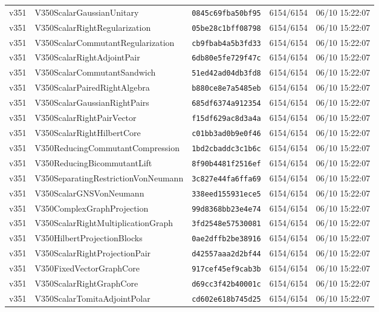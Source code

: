 \documentclass[11pt]{article}
\theoremstyle{definition}\newtheorem{deriv}{Derivação}
\begin{document}
{\begin{longtable}{@{}lllll@{}}
v351 & V350ScalarGaussianUnitary & \texttt{0845c69fba50bf95} & 6154/6154 & 06/10 15:22:07 \\
v351 & V350ScalarRightRegularization & \texttt{05be28c1bff08798} & 6154/6154 & 06/10 15:22:07 \\
v351 & V350ScalarCommutantRegularization & \texttt{cb9fbab4a5b3fd33} & 6154/6154 & 06/10 15:22:07 \\
v351 & V350ScalarRightAdjointPair & \texttt{6db80e5fe729f47c} & 6154/6154 & 06/10 15:22:07 \\
v351 & V350ScalarCommutantSandwich & \texttt{51ed42ad04db3fd8} & 6154/6154 & 06/10 15:22:07 \\
v351 & V350ScalarPairedRightAlgebra & \texttt{b880ce8e7a5485eb} & 6154/6154 & 06/10 15:22:07 \\
v351 & V350ScalarGaussianRightPairs & \texttt{685df6374a912354} & 6154/6154 & 06/10 15:22:07 \\
v351 & V350ScalarRightPairVector & \texttt{f15df629ac8d3a4a} & 6154/6154 & 06/10 15:22:07 \\
v351 & V350ScalarRightHilbertCore & \texttt{c01bb3ad0b9e0f46} & 6154/6154 & 06/10 15:22:07 \\
v351 & V350ReducingCommutantCompression & \texttt{1bd2cbaddc3c1b6c} & 6154/6154 & 06/10 15:22:07 \\
v351 & V350ReducingBicommutantLift & \texttt{8f90b4481f2516ef} & 6154/6154 & 06/10 15:22:07 \\
v351 & V350SeparatingRestrictionVonNeumann & \texttt{3c827e44fa6ffa69} & 6154/6154 & 06/10 15:22:07 \\
v351 & V350ScalarGNSVonNeumann & \texttt{338eed155931ece5} & 6154/6154 & 06/10 15:22:07 \\
v351 & V350ComplexGraphProjection & \texttt{99d8368bb23e4e74} & 6154/6154 & 06/10 15:22:07 \\
v351 & V350ScalarRightMultiplicationGraph & \texttt{3fd2548e57530081} & 6154/6154 & 06/10 15:22:07 \\
v351 & V350HilbertProjectionBlocks & \texttt{0ae2dffb2be38916} & 6154/6154 & 06/10 15:22:07 \\
v351 & V350ScalarRightProjectionPair & \texttt{d42557aaa2d2bf44} & 6154/6154 & 06/10 15:22:07 \\
v351 & V350FixedVectorGraphCore & \texttt{917cef45ef9cab3b} & 6154/6154 & 06/10 15:22:07 \\
v351 & V350ScalarRightGraphCore & \texttt{d69cc3f42b40001c} & 6154/6154 & 06/10 15:22:07 \\
v351 & V350ScalarTomitaAdjointPolar & \texttt{cd602e618b745d25} & 6154/6154 & 06/10 15:22:07 \\

\end{longtable}}
\end{document}
